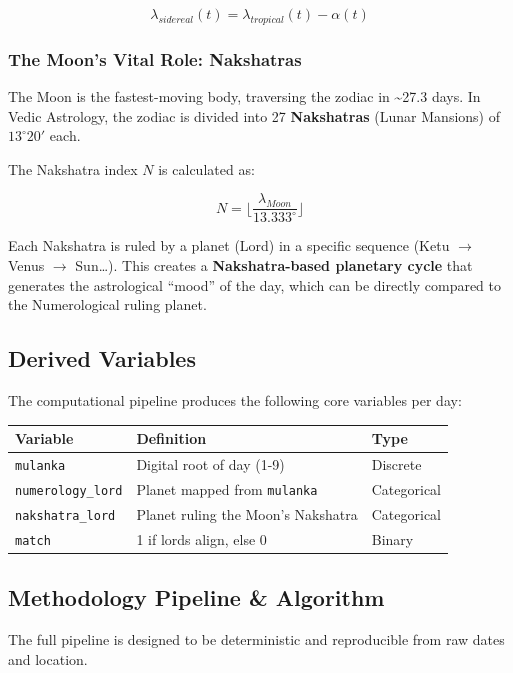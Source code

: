 \documentclass[
  11pt,
  a4paper,
  oneside,
  openany]{article}
\begin{document}
\[
\lambda_{sidereal}(t) = \lambda_{tropical}(t) - \alpha(t)
\]

\subsubsection{The Moon's Vital Role:
Nakshatras}\label{the-moons-vital-role-nakshatras}

The Moon is the fastest-moving body, traversing the zodiac in
\textasciitilde27.3 days. In Vedic Astrology, the zodiac is divided into
27 \textbf{Nakshatras} (Lunar Mansions) of \(13^\circ 20'\) each.

The Nakshatra index \(N\) is calculated as:

\[
N = \lfloor \frac{\lambda_{Moon}}{13.333^\circ} \rfloor
\]

Each Nakshatra is ruled by a planet (Lord) in a specific sequence (Ketu
\(\to\) Venus \(\to\) Sun\ldots). This creates a \textbf{Nakshatra-based
planetary cycle} that generates the astrological ``mood'' of the day,
which can be directly compared to the Numerological ruling planet.

\subsection{Derived Variables}\label{derived-variables}

The computational pipeline produces the following core variables per
day:

\begin{longtable}[]{@{}lll@{}}
\toprule\noalign{}
Variable & Definition & Type \\
\midrule\noalign{}
\endhead
\bottomrule\noalign{}
\endlastfoot
\texttt{mulanka} & Digital root of day (1-9) & Discrete \\
\texttt{numerology\_lord} & Planet mapped from \texttt{mulanka} &
Categorical \\
\texttt{nakshatra\_lord} & Planet ruling the Moon's Nakshatra &
Categorical \\
\texttt{match} & 1 if lords align, else 0 & Binary \\
\end{longtable}

\subsection{Methodology Pipeline \&
Algorithm}\label{methodology-pipeline-algorithm}

The full pipeline is designed to be deterministic and reproducible from
raw dates and location.
\end{document}
